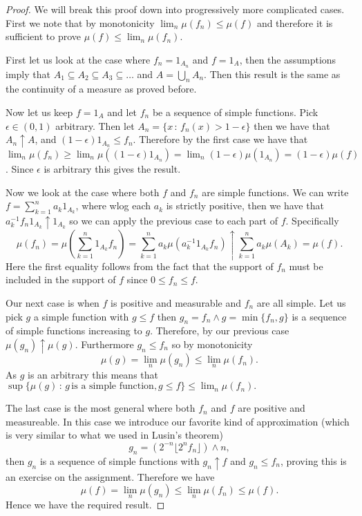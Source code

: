 \documentclass[11pt]{article}
\theoremstyle{definition}
\theoremstyle{remark}
\begin{document}
\begin{proof}
We will break this proof down into progressively more complicated cases. First we note that by monotonicity $\lim_n \mu(f_n) \leq \mu(f)$ and therefore it is sufficient to prove $\mu(f) \leq \lim_n \mu(f_n)$.

First let us look at the case where $f_n = 1_{A_n}$ and $f=1_{A}$, then the assumptions imply that $A_1 \subseteq A_2 \subseteq A_3 \subseteq \dots$ and $A= \bigcup_n A_n$. Then this result is the same as the continuity of a measure as proved before.

Now let us keep $f=1_{A}$ and let $f_n$ be a sequence of simple functions. Pick $\epsilon \in (0,1)$ arbitrary. Then let $A_n = \{ x\,:\, f_n(x)>1-\epsilon\}$ then we have that $A_n \uparrow A$, and $(1-\epsilon)1_{A_n} \leq f_n$. Therefore by the first case we have that $\lim_n \mu(f_n) \geq \lim_n \mu((1-\epsilon)1_{A_n}) = \lim_n (1-\epsilon) \mu(1_{A_n}) = (1-\epsilon) \mu(f)$. Since $\epsilon$ is arbitrary this gives the result.

Now we look at the case where both $f$ and $f_n$ are simple functions. We can write $f = \sum_{k=1}^n a_k 1_{A_k}$, where wlog each $a_k$ is strictly positive, then we have that $a_k^{-1} f_n 1_{A_k} \uparrow 1_{A_k}$ so we can apply the previous case to each part of $f$. Specifically
\[ \mu(f_n) = \mu(\sum_{k=1}^n  1_{A_k}f_n) = \sum_{k=1}^n a_k \mu (a_k^{-1} 1_{A_k}f_n) \uparrow \sum_{k=1}^n a_k \mu(A_k) = \mu(f). \] Here the first equality follows from the fact that the support of $f_n$ must be included in the support of $f$ since $0 \leq f_n \leq f$.

Our next case is when $f$ is positive and measurable and $f_n$ are all simple. Let us pick $g$ a simple function with $g \leq f$ then $g_n = f_n \wedge g = \min\{f_n, g\}$ is a sequence of simple functions increasing to $g$. Therefore, by our previous case $\mu(g_n) \uparrow \mu(g)$. Furthermore $g_n \leq f_n$ so by monotonicity \[ \mu(g) =\lim_n \mu(g_n) \leq \lim_n \mu(f_n).\] As $g$ is an arbitrary this means that $\sup\{\mu(g)\,:\, g \, \mbox{is a simple function}, g \leq f\} \leq \lim_n \mu(f_n).$

The last case is the most general where both $f_n$ and $f$ are positive and measureable. In this case we introduce our favorite kind of approximation (which is very similar to what we used in Lusin's theorem)
\[ g_n = \left( 2^{-n} \lfloor 2^n f_n \rfloor \right) \wedge n, \] then $g_n$ is a sequence of simple functions with $g_n \uparrow f$ and $g_n \leq f_n$, proving this is an exercise on the assignment. Therefore we have
\[ \mu(f) = \lim_n \mu(g_n) \leq \lim_n \mu(f_n) \leq \mu(f). \] Hence we have the required result.
\end{proof}
\end{document}
